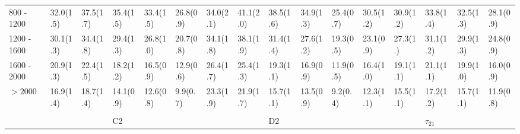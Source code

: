 \begin{table}
{\begin{tabular}{llllllllllllllll}
\multicolumn{1}{l||}{800 - 1200} & 	\multicolumn{1}{l|}{32.0(1.5)} & 	 \multicolumn{1}{l|}{37.5(1.7)} & 		\multicolumn{1}{l|}{35.4(1.5)} & 	 \multicolumn{1}{l|}{33.4(1.5)} & 	  \multicolumn{1}{l||}{26.8(0.9)} &  	\multicolumn{1}{l|}{34.0(2.1)} & 	\multicolumn{1}{l|}{\cellcolor{Red!50}41.1(2.0)} & 		\multicolumn{1}{l|}{38.5(1.6)} & 		\multicolumn{1}{l|}{34.9(1.3)} & 	 \multicolumn{1}{l||}{25.4(0.7)} & 	   \multicolumn{1}{l|}{30.5(1.2)} & \multicolumn{1}{l|}{30.9(1.2)} & \multicolumn{1}{l|}{33.8(1.4)} & \multicolumn{1}{l|}{32.5(1.3)} & \multicolumn{1}{l|}{28.1(0.9)} \\
\multicolumn{1}{l||}{1200 - 1600} & \multicolumn{1}{l|}{30.1(1.3)} & 	 \multicolumn{1}{l|}{34.4(1.8)} & 		\multicolumn{1}{l|}{29.4(1.3)} & 	 \multicolumn{1}{l|}{26.8(1.0)} & 	  \multicolumn{1}{l||}{20.7(0.8)} &  	\multicolumn{1}{l|}{34.1(1.8)} & 	\multicolumn{1}{l|}{\cellcolor{Red!50}38.1(1.9)} & 		\multicolumn{1}{l|}{31.4(1.4)} & 		\multicolumn{1}{l|}{27.6(1.2)} & 	 \multicolumn{1}{l||}{19.3(0.5)} & 	   \multicolumn{1}{l|}{23.1(0.9)} & \multicolumn{1}{l|}{27.3(1.)} & \multicolumn{1}{l|}{31.1(1.2)} & \multicolumn{1}{l|}{29.9(1.3)} & \multicolumn{1}{l|}{24.8(0.9)} \\
\multicolumn{1}{l||}{1600 - 2000} & \multicolumn{1}{l|}{20.9(1.3)} & 	 \multicolumn{1}{l|}{22.4(1.5)} & 		\multicolumn{1}{l|}{18.2(1.2)} & 	 \multicolumn{1}{l|}{16.5(0.9)} & 	  \multicolumn{1}{l||}{12.9(0.6)} &  	\multicolumn{1}{l|}{26.4(1.7)} & 	\multicolumn{1}{l|}{\cellcolor{Red!50}25.4(1.3)} & 		\multicolumn{1}{l|}{19.3(1.1)} & 		\multicolumn{1}{l|}{16.9(0.9)} & 	 \multicolumn{1}{l||}{11.9(0.5)} & 	   \multicolumn{1}{l|}{16.4(1.0)} & \multicolumn{1}{l|}{19.1(1.1)} & \multicolumn{1}{l|}{21.1(1.1)} & \multicolumn{1}{l|}{19.9(1.0)} & \multicolumn{1}{l|}{16.0(0.9)} \\
\multicolumn{1}{l||}{$>2000$} & 	\multicolumn{1}{l|}{16.9(1.4)} & 	 \multicolumn{1}{l|}{18.7(1.4)} & 		\multicolumn{1}{l|}{14.1(0.9)} & 	 \multicolumn{1}{l|}{12.6(0.8)} & 	  \multicolumn{1}{l||}{9.9(0.7)} & 		\multicolumn{1}{l|}{23.3(1.9)} & 	\multicolumn{1}{l|}{\cellcolor{Red!50}21.9(1.7)} & 		\multicolumn{1}{l|}{15.7(1.1)} & 		\multicolumn{1}{l|}{13.5(0.9)} & 	 \multicolumn{1}{l||}{9.2(0.4)} & 	   \multicolumn{1}{l|}{12.3(1.1)} & \multicolumn{1}{l|}{15.5(1.1)} & \multicolumn{1}{l|}{17.2(1.2)} & \multicolumn{1}{l|}{15.7(1.1)} & \multicolumn{1}{l|}{11.9(0.8)} \\ \hline
 &  &  &  &  &  &  &  &  &  &  &  &  &  &  &  \\
\rowcolor{Gray} \multicolumn{1}{l||}{\textbf{TAS}} &  &  & C2 &  & \multicolumn{1}{l||}{} &  &  & D2 &  & \multicolumn{1}{l||}{} &  &  & $\tau_{21}$ &  & \multicolumn{1}{l|}{} \\ \hline

\end{tabular}}
\end{table}

